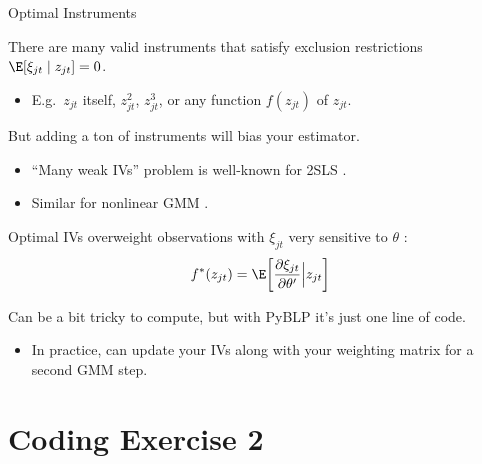 \documentclass[aspectratio=169,t,11pt,table]{beamer}
\begin{document}
\begin{frame}{Optimal Instruments}
    \begin{wideitemize}
        \item There are many valid instruments that satisfy exclusion restrictions $\E[\xi_{jt} \mid z_{jt}] = 0$.
        \begin{itemize}
            \item E.g.\ $z_{jt}$ itself, $z_{jt}^2$, $z_{jt}^3$, or any function $f(z_{jt})$ of $z_{jt}$.
        \end{itemize}
        \pause
        \item But adding a ton of instruments will bias your estimator.
        \begin{itemize}
            \item ``Many weak IVs'' problem is well-known for 2SLS \citep*{angrist1999jackknife}.
            \item Similar for nonlinear GMM \citep{han2006gmm,newey2009generalized}.
        \end{itemize}
        \pause
        \item \alert{Optimal IVs} overweight observations with $\xi_{jt}$ very sensitive to $\theta$ \citep{chamberlain1987asymptotic}:
        \begin{equation*}
            f^*(z_{jt}) = \E\bigg[\frac{\partial\xi_{jt}}{\partial\theta'} \Big| z_{jt}\bigg]
        \end{equation*}
        \vspace{-1.5\baselineskip}
        \pause
        \item Can be a bit tricky to compute, but with PyBLP it's just one line of code.
        \begin{itemize}
            \item In practice, can update your IVs along with your weighting matrix for a second GMM step.
        \end{itemize}
    \end{wideitemize}
\end{frame}

\section{Coding Exercise 2}
\end{document}
